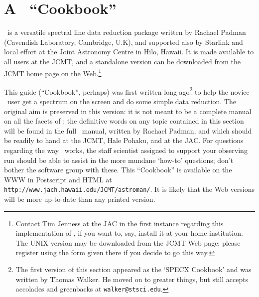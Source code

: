 \stardocabstract


 \newpage
 \begin{latexonly}
   \setlength{\parskip}{0mm}
   \latexonlytoc
   \setlength{\parskip}{\medskipamount}
   \markboth{\stardocname}{\stardocname}
 \end{latexonly}
\cleardoublepage
\renewcommand{\thepage}{\arabic{page}}
\setcounter{page}{1}

\section{A \SPECX\ ``Cookbook''}
\label{sec:specx-cookbook}
\SPECX\ is a versatile spectral line data reduction package written by Rachael 
Padman (Cavendish Laboratory, Cambridge, U.K), and supported also by
Starlink and local effort at the Joint Astronomy Centre in Hilo,
Hawaii.  It is made available to all users at the JCMT, and a
standalone version can be downloaded from the JCMT home page on the
Web.\footnote{Contact Tim Jenness at the JAC in the first instance
regarding this implementation of
\SPECX , if you want to, say, install it at your home institution. The
UNIX version may be downloaded from the JCMT Web page; please register
using the form given there if you decide to go this way.}

This guide (``Cookbook'', perhaps) was first written long
ago\footnote{The first version of this section appeared as the `SPECX
Cookbook' and was written by Thomas Walker. He moved on to greater
things, but still accepts accolades and greenbacks at
{\tt walker@stsci.edu}.} to help the novice
\SPECX\ user get a spectrum on the screen and do some simple data reduction. 
The original aim is preserved in this version: it is not meant to be a
complete manual on all the facets of \SPECX ; the definitive words on
any topic contained in this section will be found in the full \SPECX\
manual, written by Rachael Padman, and which should be readily to hand
at the JCMT, Hale Pohaku, and at the JAC.  For questions regarding the
way \SPECX\ works, the staff scientist assigned to support your
observing run should be able to assist in the more mundane `how-to'
questions; don't bother the software group with these. This
``Cookbook'' is available on the WWW in Postscript and HTML at
\verb|http://www.jach.hawaii.edu/JCMT/astroman/|. It is likely that the
Web versions will be more up-to-date than any printed version.

